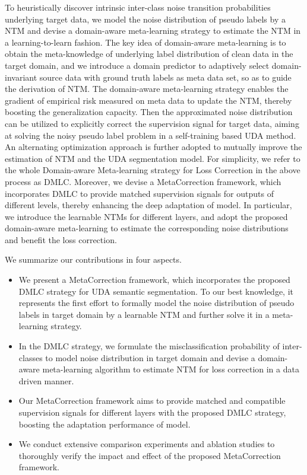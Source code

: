 \documentclass[final]{cvpr}
\begin{document}
To heuristically discover intrinsic inter-class noise transition probabilities underlying target data, we model the noise distribution of pseudo labels by a NTM and devise a domain-aware meta-learning strategy to estimate the NTM in a learning-to-learn fashion. The key idea of domain-aware meta-learning is to obtain the meta-knowledge of underlying label distribution of clean data in the target domain, and we introduce a domain predictor to adaptively select domain-invariant source data with ground truth labels as meta data set, so as to guide the derivation of NTM. The domain-aware meta-learning strategy enables the gradient of empirical risk measured on meta data to update the NTM, thereby boosting the generalization capacity. Then the approximated noise distribution can be utilized to explicitly correct the supervision signal for target data, aiming at solving the noisy pseudo label problem in a self-training based UDA method. An alternating optimization approach is further adopted to mutually improve the estimation of NTM and the UDA segmentation model. For simplicity, we refer to the whole Domain-aware Meta-learning strategy for Loss Correction in the above process as DMLC. Moreover, we devise a MetaCorrection framework, which incorporates DMLC to provide matched supervision signals for outputs of different levels, thereby enhancing the deep adaptation of model. In particular, we introduce the learnable NTMs for different layers, and adopt the proposed domain-aware meta-learning to estimate the corresponding noise distributions and benefit the loss correction.  

We summarize our contributions in four aspects. 
\begin{itemize}
\vspace{-0.3cm}
  \item We present a MetaCorrection framework, which incorporates the proposed DMLC strategy for UDA semantic segmentation. To our best knowledge, it represents the first effort to formally model the noise distribution of pseudo labels in target domain by a learnable NTM and further solve it in a meta-learning strategy.
\vspace{-0.3cm}
  \item In the DMLC strategy, we formulate the misclassification probability of inter-classes to model noise distribution in target domain and devise a domain-aware meta-learning algorithm to estimate NTM for loss correction in a data driven manner. 
\vspace{-0.3cm}
  \item Our MetaCorrection framework aims to provide matched and compatible supervision signals for different layers with the proposed DMLC strategy, boosting the adaptation performance of model. 
\vspace{-0.3cm}
  \item We conduct extensive comparison experiments and ablation studies to thoroughly verify the impact and effect of the proposed MetaCorrection framework. 
\end{itemize}
\end{document}
